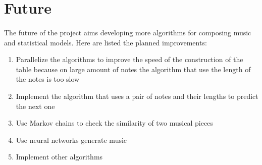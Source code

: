 \documentclass[]{article}
\begin{document}
        \newpage
    \section{Future}
        \paragraph{}The future of the project aims developing more algorithms for composing music and statistical models. Here are listed the planned improvements:
        \begin{enumerate}
            \item Parallelize the algorithms to improve the speed of the construction of the table because on large amount of notes the algorithm that use the length of the notes is too slow
            \item Implement the algorithm that uses a pair of notes and their lengths to predict the next one
            \item Use Markov chains to check the similarity of two musical pieces
            \item Use neural networks generate music
            \item Implement other algorithms
        \end{enumerate}
\end{document}
